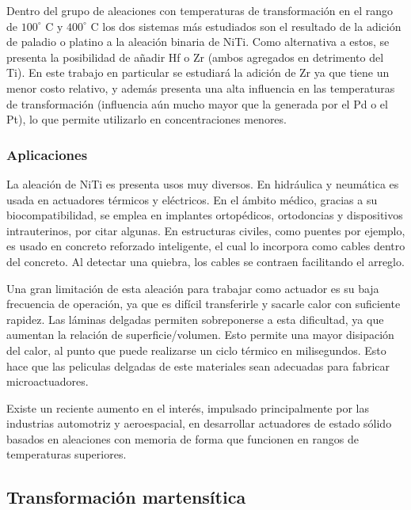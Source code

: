 \documentclass[12pt]{article}
\theoremstyle{definition}
\theoremstyle{remark}
\begin{document}
Dentro del grupo de aleaciones con temperaturas de transformación en el rango de $100^\circ$ C y $400^\circ$ C los dos sistemas más estudiados son el resultado de la adición de paladio o platino a la aleación binaria de NiTi. Como alternativa a estos, se presenta la posibilidad de añadir Hf o Zr (ambos agregados en detrimento del Ti)\cite{HTSMA}. En este trabajo en particular se estudiará la adición de Zr ya que tiene un menor costo relativo, y además presenta una alta influencia en las temperaturas de transformación (influencia aún mucho mayor que la generada por el Pd o el Pt), lo que permite utilizarlo en concentraciones menores\citep{HTSMA}.

\subsubsection{Aplicaciones}
La aleación de NiTi es presenta usos muy diversos. En hidráulica y neumática es usada en actuadores térmicos y eléctricos. En el ámbito médico, gracias a su biocompatibilidad, se emplea en implantes ortopédicos, ortodoncias y dispositivos intrauterinos, por citar algunas. En estructuras civiles, como puentes por ejemplo, es usado en concreto reforzado inteligente, el cual lo incorpora como cables dentro del concreto. Al detectar una quiebra, los cables se contraen facilitando el arreglo\cite{Engineering}.

Una gran limitación de esta aleación para trabajar como actuador es su baja frecuencia de operación, ya que es difícil transferirle y sacarle calor con suficiente rapidez. Las láminas delgadas permiten sobreponerse a esta dificultad, ya que aumentan la relación de superficie/volumen. Esto permite una mayor disipación del calor, al punto que puede realizarse un ciclo térmico en milisegundos. Esto hace que las peliculas delgadas de este materiales sean adecuadas para fabricar microactuadores\citep{ThinFilm}.

Existe un reciente aumento en el interés, impulsado principalmente por las industrias automotriz y aeroespacial, en desarrollar actuadores de estado sólido basados en aleaciones con memoria de forma que funcionen en rangos de temperaturas superiores.
\subsection{Transformación martensítica}
\end{document}
